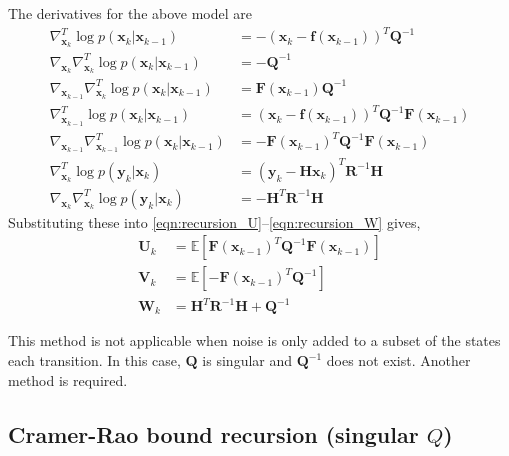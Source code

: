 \documentclass{article}
\renewcommand{\vec}[1]{\ensuremath{{\boldsymbol #1}}}
\newcommand{\mat}[1]{\ensuremath{\boldsymbol{#1}}}
\begin{document}
The derivatives for the above model are
\begin{align}
	\nabla_{\vec x_k}^T \log p(\vec x_k|\vec x_{k-1}) &= -(\vec x_k - \vec f(\vec x_{k-1}))^T\mat Q^{-1}  \\
	\nabla_{\vec x_k}\nabla_{\vec x_k}^T \log p(\vec x_k|\vec x_{k-1}) &= -\mat Q^{-1} \\
	\nabla_{\vec x_{k-1}}\nabla_{\vec x_k}^T \log p(\vec x_k|\vec x_{k-1}) &= \mat F(\vec x_{k-1})\mat Q^{-1} \\
	\nabla_{\vec x_{k-1}}^T \log p(\vec x_k|\vec x_{k-1}) &= (\vec x_k - \vec f(\vec x_{k-1}))^T\mat Q^{-1} \mat F(\vec x_{k-1}) \\
	\nabla_{\vec x_{k-1}}\nabla_{\vec x_{k-1}}^T \log p(\vec x_k|\vec x_{k-1}) &= -\mat F(\vec x_{k-1})^T\mat Q^{-1} \mat F(\vec x_{k-1}) \\
	\nabla_{\vec x_k}^T \log p(\vec y_k|\vec x_k) &= (\vec y_k - \mat H\vec x_k)^T\mat R^{-1} \mat H \\
	\nabla_{\vec x_k}\nabla_{\vec x_k}^T \log p(\vec y_k|\vec x_k) &= -\mat H^T\mat R^{-1} \mat H 
\end{align}
Substituting these into \eqref{eqn:recursion_U}--\eqref{eqn:recursion_W} gives,
\begin{align}
	 \mat U_k &= \mathbb E\left[ \mat F(\vec x_{k-1})^T\mat Q^{-1} \mat F(\vec x_{k-1}) \right ] \label{eqn:pcrb_u} \\
	\mat V_k &= \mathbb E\left[ -\mat F(\vec x_{k-1})^T\mat Q^{-1} \right ] \label{eqn:pcrb_v} \\
	\mat W_k &= \mat H^T\mat R^{-1}\mat H + \mat Q^{-1}
\end{align}

This method is not applicable when noise is only added to a subset of the states each transition. In this case, $\mat Q$ is singular and $\mat Q^{-1}$ does not exist. Another method is required.

\subsection{Cramer-Rao bound recursion (singular $Q$)} 
\end{document}
